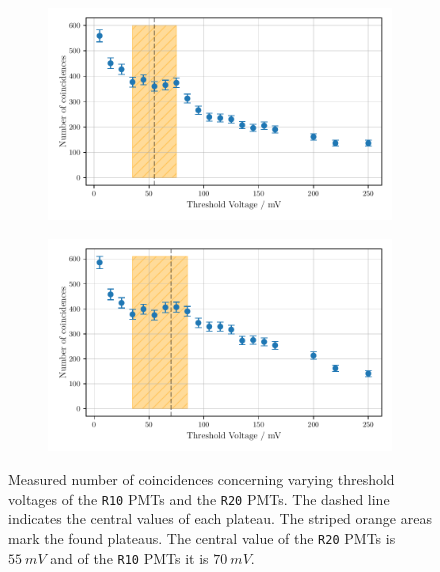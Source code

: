 \begin{figure}
    \centering
    \begin{subfigure}[b]{0.48\textwidth}
    \includegraphics[width=\textwidth]{plots/threshR20.pdf}
\end{subfigure}\hfill
\begin{subfigure}[b]{0.48\textwidth}
    \includegraphics[width=\textwidth]{plots/threshR10.pdf}
\end{subfigure}
\caption{Measured number of coincidences concerning varying threshold voltages
of the \texttt{R10} PMTs and the \texttt{R20} PMTs.
The dashed line indicates the central values of each plateau. The striped orange areas mark the found plateaus. The central value of the 
\texttt{R20} PMTs is $\SI{55}{mV}$ and of the \texttt{R10} PMTs it is $\SI{70}{mV}$.}
\label{fig:threshR10R20}
\end{figure}
